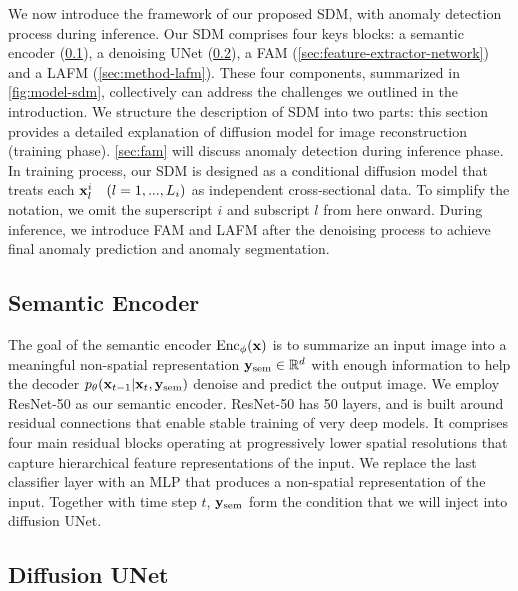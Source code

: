 We now introduce the framework of our proposed SDM, with anomaly detection process during inference. Our SDM comprises four keys blocks: a semantic encoder (\cref{sec:method-semantic-encoder}), a denoising UNet (\cref{sec:method-unet}), a \ac{FAM} (\cref{sec:feature-extractor-network}) and a \ac{LAFM} (\cref{sec:method-lafm}). These four components, summarized in \cref{fig:model-sdm}, collectively can address the challenges we outlined in the introduction. We structure the description of SDM into two parts: this section provides a detailed explanation of diffusion model for image reconstruction (training phase). \cref{sec:fam} will discuss anomaly detection during inference phase. In training process, our SDM is designed as a conditional diffusion model that treats each ${\mathbf{x}}^i_l \quad (l = 1, ..., L_i)$ as independent cross-sectional data. To simplify the notation, we omit the superscript $i$ and subscript $l$ from here onward. During inference, we introduce \ac{FAM} and \ac{LAFM} after the denoising process to achieve final anomaly prediction and anomaly segmentation. 

\subsection{Semantic Encoder}
\label{sec:method-semantic-encoder}

The goal of the semantic encoder $\mathrm{Enc}_\phi({\mathbf{x}})$ is to summarize an input image into a meaningful non-spatial representation ${\mathbf{y}}_{\text{sem}} \in \mathbb{R}^d$ with enough information to help the decoder $p_\theta({\mathbf{x}}_{t - 1}|{\mathbf{x}}_t, {\mathbf{y}}_{\text{sem}})$ denoise and predict the output image. We employ ResNet-50 \cite{ResNet50} as our semantic encoder. ResNet-50 has 50 layers, and is built around residual connections that enable stable training of very deep models. It comprises four main residual blocks operating at progressively lower spatial resolutions that capture hierarchical feature representations of the input. We replace the last classifier layer with an MLP that produces a non-spatial representation of the input. Together with time step $t$, ${\mathbf{y}}_{\text{sem}}$ form the condition that we will inject into diffusion UNet. 

\subsection{Diffusion UNet}
\label{sec:method-unet}

